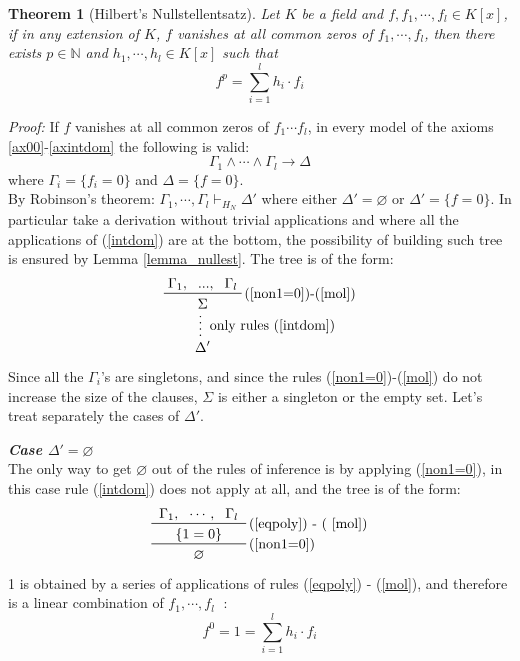 \documentclass[a4paper,12pt,oneside]{book}
\newtheorem{theorem}{Theorem}[chapter]
\let\emptyset\varnothing
\let\e\wedge
\begin{document}
\begin{theorem}[Hilbert's Nullstellentsatz]
Let $K$ be a field and $f,f_1,\cdots, f_l \in K[{x}]$, if in any extension of $K$, $f$ vanishes at all common zeros of $f_1,\cdots, f_l$, then there exists $p\in \mathbb{N}$ and $h_1,\cdots, h_l \in K[{x}]$ such that
$$
f^p = \sum_{i=1}^l h_i \cdot f_i
$$
\end{theorem}
\newpage
\textit{Proof: }If $f$ vanishes at all common zeros of $f_1\cdots f_l$, in every model of the axioms \ref{ax00}-\ref{axintdom} the following is valid:
$$ \Gamma_1\e\cdots\e\Gamma_l\rightarrow\Delta$$
where $\Gamma_i=\{f_i=0\}$ and $\Delta =\{f=0\}$.\\ By Robinson's theorem: $\Gamma_1,\cdots ,\Gamma_l \vdash_{H_N} \Delta '$ where either $\Delta '=\emptyset$ or $\Delta '=\{f=0\}$. 
In particular take a derivation without trivial applications and where all the applications of (\ref{intdom}) are at the bottom, the possibility of building such tree is ensured by Lemma \ref{lemma_nullest}. The tree is of the form:
\begin{equation*}
\prfsummary[only rules (\ref{intdom})] {\prftree[r]{(\ref{non1=0})-(\ref{mol})}{\Gamma_1,}{...,}{\Gamma_l}{\Sigma}}{\Delta '}
\end{equation*}
Since all the $\Gamma_i$'s are singletons, and since the rules (\ref{non1=0})-(\ref{mol}) do not increase the size of the clauses, $\Sigma$ is either a singleton or the empty set. Let's treat separately the cases of $\Delta '$.

\textbf{\emph{Case $\Delta '=\emptyset$}} \\
The only way to get $\emptyset$ out of the rules of inference is by applying (\ref{non1=0}), in this case rule (\ref{intdom}) does not apply at all, and the tree is of the form: 
$$
\prftree[r]{(\ref{non1=0})}
{ \prftree[r]{(\ref{eqpoly}) - ( \ref{mol})}
{ \Gamma_1, }{\cdots ,}{\Gamma_l}
{\hspace{5mm}\{1=0\}\hspace{5mm}	} 
}
{\emptyset }
$$
1 is obtained by a series of applications of rules (\ref{eqpoly}) - (\ref{mol}), and therefore is a linear  combination of $f_1,\cdots ,f_l\;$ : 
$$f^0=1 = \sum_{i=1}^l h_i \cdot f_i$$

\newpage
\end{document}

